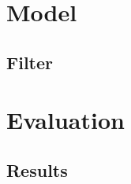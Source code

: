\documentclass{beamer}
\begin{document}
\section{Model}

\subsection{Filter}

\section{Evaluation}

\subsection{Results}
\end{document}
